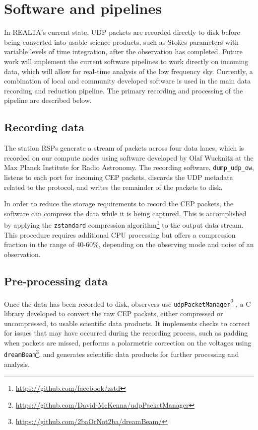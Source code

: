\section{Software and pipelines}
\label{sec:softwareAndProcessing}
In REALTA's current state, UDP packets are recorded directly to disk before being converted into usable science products, such as Stokes parameters with variable levels of time integration, after the observation has completed. Future work will implement the current software pipelines to work directly on incoming data, which will allow for real-time analysis of the low frequency sky. Currently, a combination of local and community developed software is used in the main data recording and reduction pipeline. The primary recording and processing of the pipeline are described below.

\subsection{Recording data}
\label{sec:preproc}
The station RSPs generate a stream of packets across four data lanes, which is recorded on our compute nodes using software developed by Olaf Wucknitz at the Max Planck Institute for Radio Astronomy. The recording software, \texttt{dump\_udp\_ow}, listens to each port for incoming CEP packets, discards the UDP metadata related to the protocol, and writes the remainder of the packets to disk.

In order to reduce the storage requirements to record the CEP packets, the software can compress the data while it is being captured. This is accomplished by applying the \texttt{zstandard} compression algorithm\footnote{\hyperref[zstandard]{https://github.com/facebook/zstd}} to the output data stream. This procedure requires additional CPU processing but offers a compression fraction in the range of 40-60\%, depending on the observing mode and noise of an observation.

\subsection{Pre-processing data}
\label{sec:baseproc}%
Once the data has been recorded to disk, observers use \texttt{udpPacketManager}\footnote{\hyperref[udpPacketManager]{https://github.com/David-McKenna/udpPacketManager}} \citep{McKenna2020}, a C library developed to convert the raw CEP packets, either compressed or uncompressed, to usable scientific data products. It implements checks to correct for issues that may have occurred during the recording process, such as padding when packets are missed, performs a polarmetric correction on the voltages using \texttt{dreamBeam}\footnote{\hyperref[dreamBeam]{https://github.com/2baOrNot2ba/dreamBeam/}}, and generates scientific data products for further processing and analysis.

